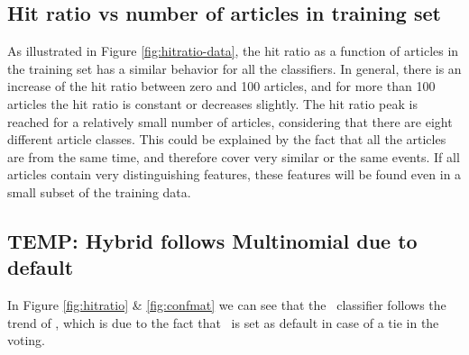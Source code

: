 \subsection{Hit ratio vs number of articles in training set}
As illustrated in Figure \ref{fig:hitratio-data}, the hit ratio as a function of articles in the training set has a similar behavior for all the classifiers. In general, there is an increase of the hit ratio between zero and 100 articles, and for more than 100 articles the hit ratio is constant or decreases slightly. The hit ratio peak is reached for a relatively small number of articles, considering that there are eight different article classes. This could be explained by the fact that all the articles are from the same time, and therefore cover very similar or the same events. If all articles contain very distinguishing features, these features will be found even in a small subset of the training data.


\subsection{TEMP: Hybrid follows Multinomial due to default} %
\label{sub:temp_hybrid_follows_multinomial_due_to_default}
In Figure \ref{fig:hitratio} \& \ref{fig:confmat} we can see that the \hy\ classifier follows the trend of \mn, which is due to the fact that \mn\ is set as default in case of a tie in the voting.


